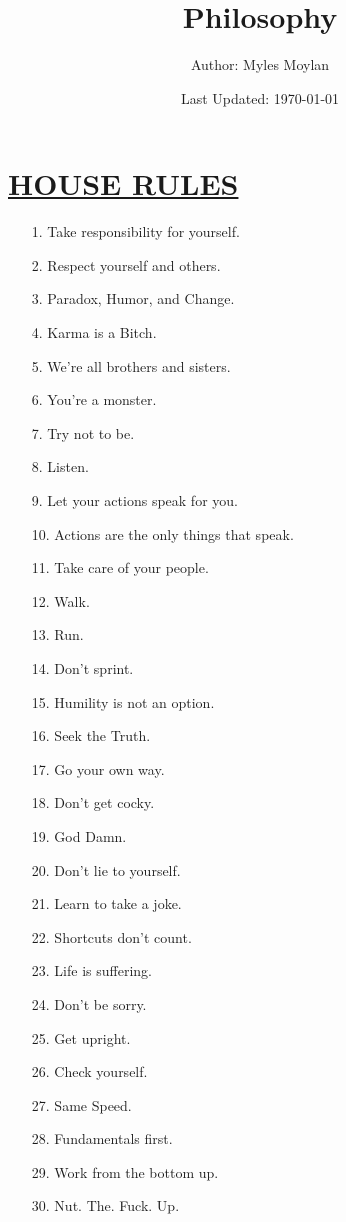 \documentclass[11pt]{article}
\title{	
	\normalfont \normalsize 
	\huge Philosophy
}
\author{Author: Myles Moylan}
\date{Last Updated: \normalsize\today}
\begin{document}
\maketitle
\section*{\ul{HOUSE RULES}}
\begin{enumerate}
	
	\item[1.] Take responsibility for yourself.
	\item[2.] Respect yourself and others.
	\item[3.] Paradox, Humor, and Change.
	\item[4.] Karma is a Bitch.
	\item[5.] We're all brothers and sisters.
	\item[6.] You're a monster.
	\item[7.] Try not to be.
	\item[8.] Listen.
	\item[9.] Let your actions speak for you.
	\item[10.] Actions are the only things that speak.
	\item[11.] Take care of your people.
	\item[12.] Walk.
	\item[13.] Run.
	\item[14.] Don't sprint.
	\item[15.] Humility is not an option.
	\item[16.] Seek the Truth.
	\item[17.] Go your own way.
	\item[18.] Don't get cocky.
	\item[19.] God Damn.
	\item[20.] Don't lie to yourself.
	\item[21.] Learn to take a joke.
	\item[22.] Shortcuts don't count.
	\item[23.] Life is suffering.
	\item[24.] Don't be sorry.
	\item[25.] Get upright.
	\item[26.] Check yourself.
	\item[27.] Same Speed.
	\item[28.] Fundamentals first.
	\item[29.] Work from the bottom up.
	\item[30.] Nut. The. Fuck. Up.

\end{enumerate}
\end{document}

